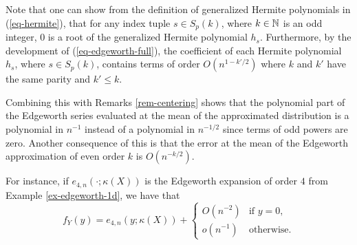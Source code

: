 \begin{remark} \label{rem-edge-mean}
    Note that one can show from the definition of generalized Hermite polynomials in (\ref{eq-hermite}), that for any index tuple $s \in S_p(k)$, where $k \in \mathbb{N}$ is an odd integer, 0 is a root of the generalized Hermite polynomial $h_s$. 
    Furthermore, by the development of (\ref{eq-edgeworth-full}), the coefficient of each Hermite polynomial $h_s$, where $s \in S_p(k)$, contains terms of order $O(n^{1-k'/2})$ where $k$ and $k'$ have the same parity and $k' \leq k$.

    Combining this with Remarks \ref{rem-centering} shows that the polynomial part of the Edgeworth series evaluated at the mean of the approximated distribution is a polynomial in $n^{-1}$ instead of a polynomial in $n^{-1/2}$ since terms of odd powers are zero. Another consequence of this is that the error at the mean of the Edgeworth approximation of even order $k$ is $O(n^{-k/2})$. 
    
    For instance, if $e_{4, n}(\cdot; \kappa(X))$ is the Edgeworth expansion of order $4$ from Example \ref{ex-edgeworth-1d}, we have that
    \begin{equation*}
        f_Y(y) = e_{4, n}(y; \kappa(X)) + \begin{cases}
            O(n^{-2}) &\text{if } y = 0,\\
            o(n^{-1}) &\text{otherwise}.
        \end{cases} 
    \end{equation*} 
\end{remark}
